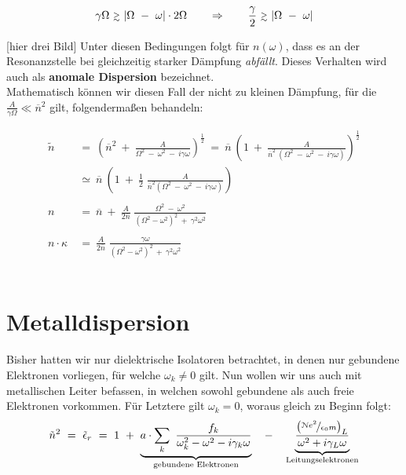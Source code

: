 \begin{equation*}
\gamma\Omega \ \mathsmaller{\mathsmaller{\gtrsim}} \ |\Omega \ - \ \omega| \cdot 2\Omega \qquad \Rightarrow \qquad \frac{\gamma}{2} \ \mathsmaller{\mathsmaller{\gtrsim}} \ |\Omega \ - \ \omega|
\end{equation*}

[hier drei Bild]
Unter diesen Bedingungen folgt für $n(\omega)$, dass es an der Resonanzstelle bei gleichzeitig starker Dämpfung \emph{abfällt}. Dieses Verhalten wird auch als \textbf{anomale Dispersion} bezeichnet.\\
Mathematisch können wir diesen Fall der nicht zu kleinen Dämpfung, für die $\frac{A}{\gamma\Omega}\ll \overline{n}^2$ gilt, folgendermaßen behandeln:

\begin{align*}
\tilde{n} \ &= \ \left(\overline{n}^2 \ + \ \frac{A}{\Omega^2 \ - \ \omega^2 \ - \ i \gamma\omega}\right)^{\frac{1}{2}}  \ = \  \overline{n} \  \left( 1 \ + \ \frac{A}{\overline{n}^2 \ \left(\Omega^2 \ - \ \omega^2 \ - \ i \gamma \omega\right)}\right)^{\frac{1}{2}}\\
&\simeq \ \overline{n} \ \left(1 \ + \ \frac{1}{2}\;\frac{A}{\overline{n}^2\left(\Omega^2 \ - \ \omega^2 \ - \ i \gamma\omega\right)}\right)\\
\ \\
n  \ &= \ \overline{n} \ + \ \frac{A}{2\overline{n}} \; \frac{\Omega^2 \ - \ \omega^2}{\left(\Omega^2-\omega^2\right)^2 \ + \ \gamma^2\omega^2}\\
\ \\
n \cdot \kappa  \ &= \ \frac{A}{2\overline{n}} \; \frac{\gamma\omega}{\left(\Omega^2-\omega^2\right)^2 \ + \ \gamma^2\omega^2} 
\end{align*}
\ \\

\section{Metalldispersion}

Bisher hatten wir nur dielektrische Isolatoren betrachtet, in denen nur gebundene Elektronen vorliegen, für welche $\omega_k \neq 0$ gilt. Nun wollen wir uns auch mit metallischen Leiter befassen, in welchen sowohl gebundene als auch freie Elektronen vorkommen. Für Letztere gilt $\omega_k = 0$, woraus gleich zu Beginn folgt:\\

\begin{equation*}
\tilde{n}^2  \ = \ \tilde{\epsilon}_r  \ = \ 1 \ + \ \underbrace{a\cdot\sum_k \ \frac{f_k}{\omega_k^2 - \omega^2 - i \gamma_k\omega}}_{\text{gebundene Elektronen}} \quad - \quad \underbrace{\frac{\left(\nicefrac{\mathcal{N}e^2}{\epsilon_0m}\right)_L}{\omega^2 + i\gamma_L\omega}}_{\text{Leitungselektronen}}
\end{equation*}

